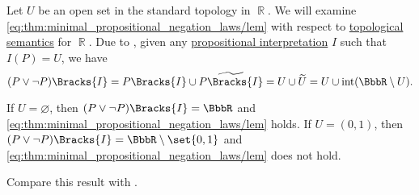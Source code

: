 \begin{example}\label{ex:topological_semantics_lem_counterexample}
  Let \( U \) be an open set in the standard topology in \( \BbbR \). We will examine \eqref{eq:thm:minimal_propositional_negation_laws/lem} with respect to \hyperref[def:propositional_topological_semantics]{topological semantics} for \( \BbbR \). Due to , given any \hyperref[def:propositional_semantics/interpretation]{propositional interpretation} \( I \) such that \( I(P) = U \), we have
  \begin{equation*}
    (P \vee \neg P)\Bracks{I}
    =
    P\Bracks{I} \cup \widetilde{P\Bracks{I}}
    =
    U \cup \widetilde{U}
    =
    U \cup \inter(\BbbR \setminus U).
  \end{equation*}

  If \( U = \varnothing \), then \( (P \vee \neg P)\Bracks{I} = \BbbR \) and \eqref{eq:thm:minimal_propositional_negation_laws/lem} holds. If \( U = (0, 1) \), then \( (P \vee \neg P)\Bracks{I} = \BbbR \setminus \set{ 0, 1 } \) and \eqref{eq:thm:minimal_propositional_negation_laws/lem} does not hold.

  Compare this result with .
\end{example}

